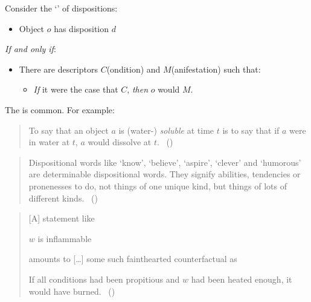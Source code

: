 \begin{note}
  Consider the `' of dispositions:%

  \begin{sketch}
    \label{sketch:dBCA}
    \vspace{-\baselineskip}
    \begin{itemize}
    \item
      Object \(o\) has disposition \(d\)
    \end{itemize}
    \emph{If and only if}:
    \begin{itemize}
    \item
      There are descriptors \(C\)(ondition) and \(M\)(anifestation) such that:
      \begin{itemize}
      \item
        \emph{If} it were the case that \(C\), \emph{then} \(o\) would \(M\).
      \end{itemize}
    \end{itemize}
    \vspace{-\baselineskip}
  \end{sketch}

  \noindent%
  The  is common.
  For example:

  \begin{quote}
    To say that an object \(a\) is (water-) \emph{soluble} at time \(t\) is to say that if \(a\) were in water at \(t\), \(a\) would dissolve at \(t\).%
    \mbox{ }\hfill\mbox{(\cite[203]{Quine:2013aa})}
  \end{quote}

  \begin{quote}
    Dispositional words like `know', `believe', `aspire', `clever' and `humorous' are determinable dispositional words.
    They signify abilities, tendencies or pronenesses to do, not things of one unique kind, but things of lots of different kinds.%
    \mbox{ }\hfill\mbox{(\cite[118]{Ryle:1949aa})}
  \end{quote}

  \begin{quote}
    [A] statement like

    \(w\) is inflammable

    amounts to [\dots] some such fainthearted counterfactual as

    If all conditions had been propitious and \(w\) had been heated enough, it would have burned.%
    \mbox{ }\hfill\mbox{(\cite[39]{Goodman:1983aa})}
  \end{quote}
\end{note}


